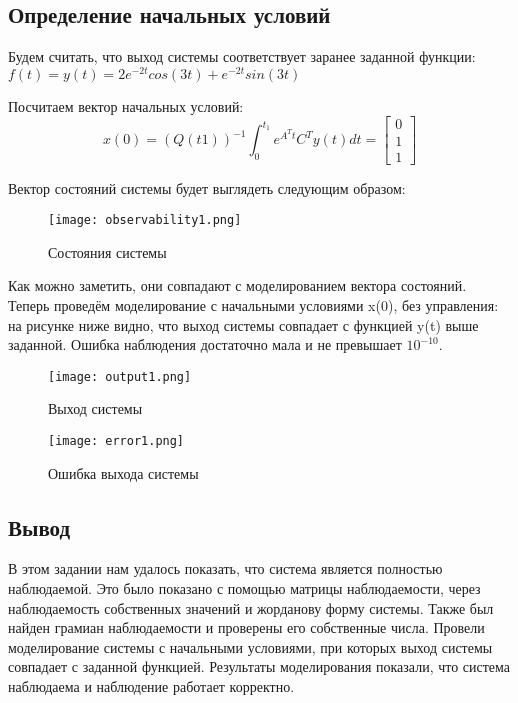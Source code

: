 \newpage
\subsection{Определение начальных условий}

Будем считать, что выход системы соответствует заранее заданной функции: $f(t) = y(t) = 2e^{-2t}cos(3t) + e^{-2t}sin(3t)$

Посчитаем вектор начальных условий:
$$
    x(0) = (Q(t1))^{-1}\int_{0}^{t_1}e^{A^Tt}C^Ty(t)dt = 
    \begin{bmatrix}
        0\\1\\1
    \end{bmatrix}
$$

Вектор состояний системы будет выглядеть следующим образом:
\begin{figure}[ht]
  \centering
  \texttt{[image: observability1.png]}
  \caption{Состояния системы}
\end{figure}

Как можно заметить, они совпадают с моделированием вектора состояний.
\newpage
Теперь проведём моделирование с начальными условиями x(0), без управления: на рисунке ниже видно,
что выход системы совпадает с функцией y(t) выше заданной. Ошибка наблюдения достаточно мала и не превышает $10^{-10}$.

\begin{figure}[ht]
    \centering
    \texttt{[image: output1.png]}
    \caption{Выход системы}
  \end{figure}

\begin{figure}[ht]
    \centering
    \texttt{[image: error1.png]}
    \caption{Ошибка выхода системы}
  \end{figure}

\newpage
\subsection{Вывод}
В этом задании нам удалось показать, что система является полностью наблюдаемой. 
Это было показано с помощью матрицы  наблюдаемости, через наблюдаемость собственных значений и жорданову форму системы.
Также был найден грамиан наблюдаемости и проверены его собственные числа. 
Провели моделирование системы с начальными условиями, при которых выход системы совпадает
с заданной функцией. Результаты моделирования показали, что система наблюдаема и
наблюдение работает корректно.

\endinput